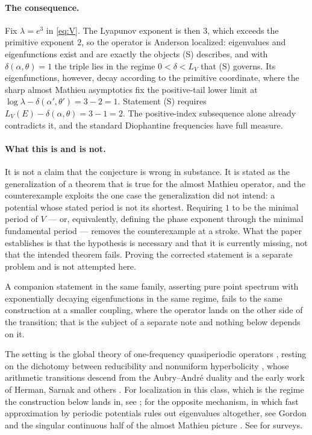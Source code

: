 \documentclass[11pt,reqno]{amsart}
\theoremstyle{plain}
\theoremstyle{definition}
\theoremstyle{remark}
\numberwithin{equation}{section}
\begin{document}
\paragraph{The consequence.} Fix $\lambda=e^{3}$ in \eqref{eq:V}. The Lyapunov
exponent is then $3$, which exceeds the primitive exponent $2$, so the
operator is Anderson localized: eigenvalues and eigenfunctions exist and are
exactly the objects (S) describes, and with $\delta(\alpha,\theta)=1$ the
triple lies in the regime $0<\delta<L_V$ that (S) governs. Its eigenfunctions,
however, decay according to the primitive coordinate, where the sharp almost
Mathieu asymptotics fix the positive-tail lower limit at
$\log\lambda-\delta(\alpha',\theta')=3-2=1$. Statement (S) requires
$L_V(E)-\delta(\alpha,\theta)=3-1=2$. The positive-index subsequence alone
already contradicts it, and the standard Diophantine frequencies have full
measure.

\paragraph{What this is and is not.} It is not a claim that the conjecture is
wrong in substance. It is stated as the generalization of a theorem that is
true for the almost Mathieu operator, and the counterexample exploits the one
case the generalization did not intend: a potential whose stated period is not
its shortest. Requiring $1$ to be the minimal period of $V$ --- or,
equivalently, defining the phase exponent through the minimal fundamental
period --- removes the counterexample at a stroke. What the paper establishes
is that the hypothesis is necessary and that it is currently missing, not that
the intended theorem fails. Proving the corrected statement is a separate
problem and is not attempted here.

A companion statement in the same family, asserting pure point spectrum with
exponentially decaying eigenfunctions in the same regime, fails to the same
construction at a smaller coupling, where the operator lands on the other side
of the transition; that is the subject of a separate note and nothing below
depends on it.

The setting is the global theory of one-frequency quasiperiodic operators
\cite{Avila_2015gt,Avila_2017sp,Avila_2009tt,Avila_2009al,Avila_2011ak},
resting on the dichotomy between reducibility and nonuniform hyperbolicity
\cite{Avila_2006ro}, whose
arithmetic transitions descend from the Aubry--Andr\'e duality and the early
work of Herman, Sarnak and others
\cite{AubryAndre_1980ab,Herman_1983um,Sarnak_1982sb,Eliasson_1992fs}. For
localization in this class, which is the regime the construction below lands
in, see
\cite{Jitomirskaya_1999mi,Jitomirskaya_1994al,Jitomirskaya_1998al,Bourgain_2000on,Bourgain_2002co,Bourgain_Book,Jitomirskaya_2016lr,Avila_2008ta,Liu_2015al,Ge_2023mj};
for the opposite mechanism, in which fast approximation by periodic potentials
rules out eigenvalues altogether, see Gordon \cite{Gordon_1976ps} and the
singular continuous half of the almost Mathieu picture
\cite{Gordon_1997da,Jitomirskaya_1994ow}. See
\cite{Damanik_2016so,Simon_2000so} for surveys.
\end{document}
